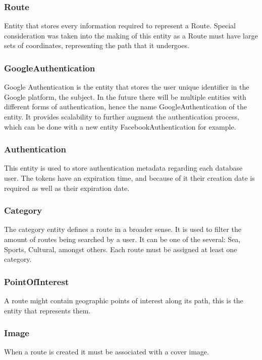         \subsubsection*{Route}
        Entity that stores every information required to represent a Route. Special consideration was taken into the making
        of this entity as a Route must have large sets of coordinates, representing the path that it undergoes. 

        \subsubsection*{GoogleAuthentication}
        Google Authentication is the entity that stores the user unique identifier in the Google platform, the subject.
        In the future there will be multiple entities with different forms of authentication, hence the name GoogleAuthentication 
        of the entity. It provides scalability to further augment the authentication process, which can be done
        with a new entity FacebookAuthentication for example.

        \subsubsection*{Authentication}
        This entity is used to store authentication metadata regarding each database user. The tokens have an expiration time,
        and because of it their creation date is required as well as their expiration date.

        \subsubsection*{Category}
        The category entity defines a route in a broader sense. It is used to filter the amount of routes being 
        searched by a user. It can be one of the several: Sea, Sports, Cultural, amongst others.
        Each route must be assigned at least one category.

        \subsubsection*{PointOfInterest}
        A route might contain geographic points of interest along its path, this is the entity that represents them. 

        \subsubsection*{Image}
        When a route is created it must be associated with a cover image.


